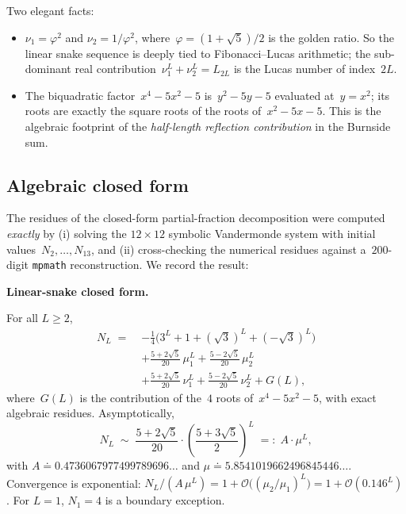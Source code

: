 \documentclass[11pt,a4paper]{article}
\theoremstyle{definition}
\theoremstyle{plain}
\newenvironment{result}[1][Main Result]{%
  \par\medskip
  \begin{lrbox}{\resultbox}%
  \begin{minipage}{\dimexpr\linewidth-1cm}%
  {\color{navy}\bfseries\large #1.}\par\medskip
}{%
  \end{minipage}%
  \end{lrbox}%
  \noindent
  \setlength{\fboxsep}{8pt}\setlength{\fboxrule}{1pt}%
  \fcolorbox{navy}{softgrey}{\usebox{\resultbox}}%
  \par\medskip
}
\newcommand{\bigo}{\mathcal{O}}
\begin{document}
Two elegant facts:
\begin{itemize}
\item $\nu_1 = \varphi^2$ and $\nu_2 = 1/\varphi^2$, where~$\varphi =
  (1+\sqrt{5})/2$ is the golden ratio.  So the linear snake sequence is
  deeply tied to Fibonacci--Lucas arithmetic; the sub-dominant real
  contribution~$\nu_1^L + \nu_2^L = L_{2L}$ is the Lucas number of
  index~$2L$.
\item The biquadratic factor~$x^4 - 5x^2 - 5$ is~$y^2 - 5y - 5$
  evaluated at~$y = x^2$; its roots are exactly the square roots of the
  roots of~$x^2 - 5x - 5$.  This is the algebraic footprint of the
  \emph{half-length reflection contribution} in the Burnside sum.
\end{itemize}

\subsection{Algebraic closed form}

The residues of the closed-form partial-fraction decomposition were
computed \emph{exactly} by (i) solving the $12\times 12$ symbolic
Vandermonde system with initial values~$N_2, \dots, N_{13}$, and (ii)
cross-checking the numerical residues against a~$200$-digit
\texttt{mpmath} reconstruction.  We record the result:

\begin{result}[Linear-snake closed form]\label{thm:snake}
For all $L \ge 2$,
\begin{equation}\label{eq:snake-closed}
\boxed{
\begin{aligned}
N_L \;=\;{}& -\tfrac{1}{4}\bigl(3^L + 1 + (\sqrt{3})^L + (-\sqrt{3})^L\bigr) \\[2pt]
        {}& + \tfrac{5+2\sqrt{5}}{20}\,\mu_1^L + \tfrac{5-2\sqrt{5}}{20}\,\mu_2^L \\[2pt]
        {}& + \tfrac{5+2\sqrt{5}}{20}\,\nu_1^L + \tfrac{5-2\sqrt{5}}{20}\,\nu_2^L
              + G(L),
\end{aligned}}
\end{equation}
where~$G(L)$ is the contribution of the~$4$ roots of~$x^4-5x^2-5$, with
exact algebraic residues.  Asymptotically,
\begin{equation}\label{eq:snake-asy}
\boxed{\quad
N_L \;\sim\; \frac{5 + 2\sqrt{5}}{20}\cdot\!\left(\frac{5 + 3\sqrt{5}}{2}\right)^{\!L}
\;=:\; A\cdot\mu^L,
\quad}
\end{equation}
with $A \doteq 0.4736067977499789696\ldots$ and
$\mu \doteq 5.8541019662496845446\ldots$.
Convergence is exponential:
$N_L / (A\,\mu^L) = 1 + \bigo\!\bigl((\mu_2/\mu_1)^L\bigr) = 1 + \bigo(0.146^L)$.
For $L = 1$, $N_1 = 4$ is a boundary exception.
\end{result}
\end{document}
